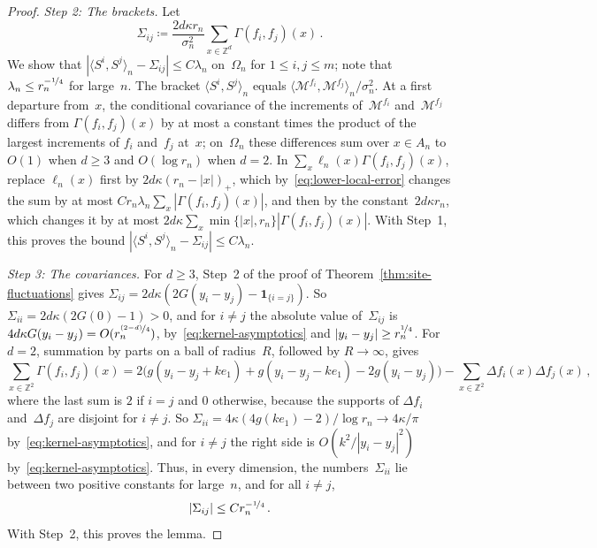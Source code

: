 \documentclass[11pt]{amsart}
\theoremstyle{plain}
\theoremstyle{definition}
\newcommand{\Z}{\mathbb Z}
\newcommand{\drift}{\kappa}
\newcommand{\ind}{\mathbf 1}
\newcommand{\nf}{\nicefrac}
\numberwithin{equation}{section}
\begin{document}
\begin{proof}
\emph{Step 2: The brackets.} Let
\begin{equation*}
\Sigma_{ij}\coloneqq\frac{2d\drift r_n}{\sigma_n^2}\sum_{x\in\Z^d}\Gamma(f_i,f_j)(x)\, .
\end{equation*}
We show that $|\langle S^i,S^j\rangle_n-\Sigma_{ij}|\leq C\lambda_n$ on~$\Omega_n$ for $1\leq i,j\leq m$; note that $\lambda_n\leq r_n^{-\nf14}$ for large~$n$. The bracket $\langle S^i,S^j\rangle_n$ equals $\langle\mathcal M^{f_i},\mathcal M^{f_j}\rangle_n/\sigma_n^2$. At a first departure from~$x$, the conditional covariance of the increments of~$\mathcal M^{f_i}$ and~$\mathcal M^{f_j}$ differs from $\Gamma(f_i,f_j)(x)$ by at most a constant times the product of the largest increments of $f_i$ and~$f_j$ at~$x$; on~$\Omega_n$ these differences sum over $x\in A_n$ to $O(1)$ when $d\geq3$ and $O(\log r_n)$ when $d=2$. In $\sum_x\ell_n(x)\Gamma(f_i,f_j)(x)$, replace $\ell_n(x)$ first by $2d\drift(r_n-|x|)_+$, which by~\eqref{eq:lower-local-error} changes the sum by at most $Cr_n\lambda_n\sum_x|\Gamma(f_i,f_j)(x)|$, and then by the constant~$2d\drift r_n$, which changes it by at most $2d\drift\sum_x\min\{|x|,r_n\}|\Gamma(f_i,f_j)(x)|$. With Step~1, this proves the bound $|\langle S^i,S^j\rangle_n-\Sigma_{ij}|\leq C\lambda_n$.

\emph{Step 3: The covariances.} For $d\geq3$, Step~2 of the proof of Theorem~\ref{thm:site-fluctuations} gives $\Sigma_{ij}=2d\drift(2G(y_i-y_j)-\ind_{\{i=j\}})$. So $\Sigma_{ii}=2d\drift(2G(0)-1)>0$, and for $i\neq j$ the absolute value of~$\Sigma_{ij}$ is $4d\drift G(y_i-y_j)=O(r_n^{\nf{(2-d)}{4}})$, by~\eqref{eq:kernel-asymptotics} and $|y_i-y_j|\geq r_n^{\nf14}$. For $d=2$, summation by parts on a ball of radius~$R$, followed by $R\to\infty$, gives
\begin{equation*}
\sum_{x\in\Z^2}\Gamma(f_i,f_j)(x)=2\bigl(g(y_i-y_j+ke_1)+g(y_i-y_j-ke_1)-2g(y_i-y_j)\bigr)-\sum_{x\in\Z^2}\Delta f_i(x)\Delta f_j(x)\, ,
\end{equation*}
where the last sum is $2$ if $i=j$ and $0$ otherwise, because the supports of $\Delta f_i$ and~$\Delta f_j$ are disjoint for $i\neq j$. So $\Sigma_{ii}=4\drift(4g(ke_1)-2)/\log r_n\to4\drift/\pi$ by~\eqref{eq:kernel-asymptotics}, and for $i\neq j$ the right side is $O(k^2/|y_i-y_j|^2)$ by~\eqref{eq:kernel-asymptotics}. Thus, in every dimension, the numbers~$\Sigma_{ii}$ lie between two positive constants for large~$n$, and for all $i\neq j$,
\begin{equation}\label{eq:bulk-correlation}
|\Sigma_{ij}|\leq Cr_n^{-\nf14}\, .
\end{equation}
With Step~2, this proves the lemma.
\end{proof}
\end{document}
